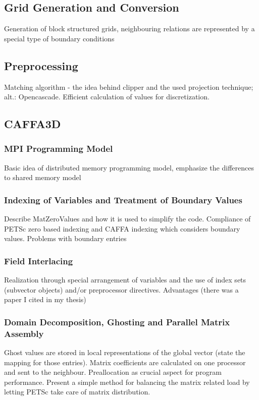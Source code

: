 \documentclass[article,type=msc,colorback,accentcolor=tud2a]{tudthesis}
\begin{document}
    \subsection{Grid Generation and Conversion}

      Generation of block structured grids, neighbouring relations are represented by a special type of boundary conditions
    \subsection{Preprocessing}
    Matching algorithm - the idea behind clipper and the used projection technique; alt.: Opencascade. Efficient calculation of values for discretization.
    \subsection{CAFFA3D}

      \subsubsection{MPI Programming Model}
        Basic idea of distributed memory programming model, emphasize the differences to shared memory model
      \subsubsection{Indexing of Variables and Treatment of Boundary Values}
      Describe MatZeroValues and how it is used to simplify the code. Compliance of PETSc zero based indexing and CAFFA indexing which considers boundary values. Problems with boundary entries
      \subsubsection{Field Interlacing}
      Realization through special arrangement of variables and the use of index sets (subvector objects) and/or preprocessor directives. Advantages (there was a paper I cited in my thesis)
      \subsubsection{Domain Decomposition, Ghosting and Parallel Matrix Assembly}

        Ghost values are stored in local representations of the global vector (state the mapping for those entries). Matrix coefficients are calculated on one processor and sent to the neighbour. Preallocation as crucial aspect for program performance. Present a simple method for balancing the matrix related load by letting PETSc take care of matrix distribution.
\end{document}
